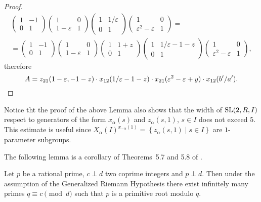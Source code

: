 \begin{proof}
\begin{multline*}
\begin{pmatrix} 1 & -1 \\ 0 & 1 \end{pmatrix}
\begin{pmatrix} 1 & 0 \\ 1-\varepsilon & 1 \end{pmatrix}
\begin{pmatrix} 1 & 1/\varepsilon \\ 0 & 1 \end{pmatrix}
\begin{pmatrix} 1 & 0 \\ \varepsilon^2-\varepsilon & 1 \end{pmatrix} =\\=
\begin{pmatrix} 1 & -1 \\ 0 & 1 \end{pmatrix}
\begin{pmatrix} 1 & 0 \\ 1-\varepsilon & 1 \end{pmatrix}
\begin{pmatrix} 1 & 1+z \\ 0 & 1 \end{pmatrix}
\begin{pmatrix} 1 & 1/\varepsilon-1-z \\ 0 & 1 \end{pmatrix}
\begin{pmatrix} 1 & 0 \\ \varepsilon^2-\varepsilon & 1 \end{pmatrix},
\end{multline*}
therefore
\[ A=z_{21}(1-\varepsilon,-1-z)\cdot x_{12}(1/\varepsilon-1-z)\cdot x_{21}(\varepsilon^2-\varepsilon+y)\cdot x_{12}(b'/a'). \qedhere \]
\end{proof}

\begin{rem}
Notice tht the proof of the above Lemma also shows that the width of $\operatorname{SL}(2, R, I)$ respect to generators of the form $x_\alpha(s)$ and $z_\alpha(s,1)$, $s\in I$ does not exceed $5$.
This estimate is useful since $X_\alpha(I)^{x_{-\alpha}(1)} = \left\{z_\alpha(s,1)\mid s\in I\right\}$ are $1$-parameter subgroups.
\end{rem}

The following lemma is a corollary of Theorems~5.7 and 5.8 of \cite{LenMorStePrimitiveRoot}.
\begin{lemma}
Let $p$ be a rational prime, $c\perp d$ two coprime integers and $p\perp d$.
Then under the assumption of the Generalized Riemann Hypothesis there exist infinitely many primes $q\equiv c\pmod{d}$ such that $p$ is a primitive root modulo $q$.
\end{lemma}

